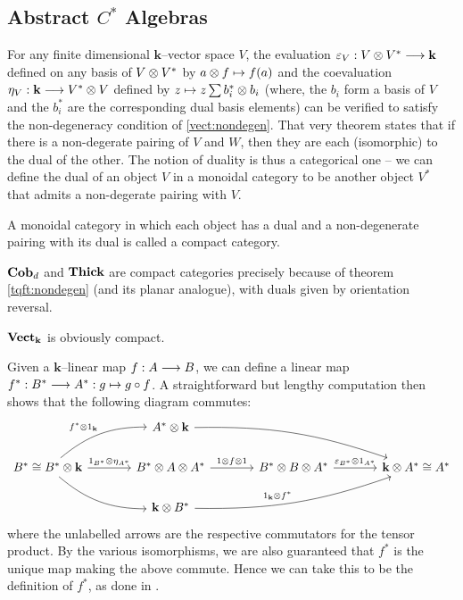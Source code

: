
\subsection{Abstract \texorpdfstring{$C^*$}{C--star} Algebras}

For any finite dimensional $\mathbf{k}$--vector space $V$, the evaluation
$\varepsilon_V : V \otimes V^* \stackrel{}{\longrightarrow} \mathbf{k}$ defined on any basis of
$V \otimes V^*$ by $a \otimes f \mapsto f(a)$ and the coevaluation
$\eta_V : \mathbf{k} \stackrel{}{\longrightarrow} V^* \otimes V$ defined by
$z \mapsto z\sum b_i^* \otimes b_i$ (where, the $b_i$ form a basis of $V$ and
the $b_i^*$ are the corresponding dual basis elements) can be verified to
satisfy the non-degeneracy condition of \ref{vect:nondegen}. That very theorem
states that if there is a non-degerate pairing of $V$ and $W$, then they are
each (isomorphic) to the dual of the other. The notion of duality is thus a
categorical one -- we can define the dual of an object $V$ in a monoidal
category to be another object $V^*$ that admits a non-degerate pairing with $V$.

\begin{defn}
A monoidal category in which each object has a dual and a non-degenerate pairing
with its dual is called a compact category.
\end{defn}

\begin{exm}
$\textbf{Cob}_d$ and $\textbf{Thick}$ are compact categories precisely because of theorem
\ref{tqft:nondegen} (and its planar analogue), with duals given by orientation
reversal.
\end{exm}

\begin{exm}
$\textbf{Vect}_{\mathbf{k}}$ is obviously compact.
\end{exm}

Given a $\mathbf{k}$--linear map $f : A \stackrel{}{\longrightarrow} B$, we can define a linear map
$f^* : B^* \stackrel{}{\longrightarrow} A^* : g \mapsto g \circ f$. A straightforward but lengthy computation
then shows that the following diagram commutes:
\begin{eqnarray*}
\begin{tikzcd}[column sep=large]
& A^* \m \mathbf{k} \arrow[drr, bend left=10] & & \\
B^* \cong B^* \m \mathbf{k}
  \arrow[r, "1_{B^*} \m \eta_{A^*}"]
  \arrow[ur, bend left=20, "f^* \m 1_{\mathbf{k}}"]
  \arrow[dr, bend right=20] &
B^* \m A \m A^* \arrow[r, "1 \m f \m 1"] &
B^* \m B \m A^* \arrow[r, "\eps_{B^*} \m 1_{A^*}"] &
\mathbf{k} \m A^* \cong A^* \\
& \mathbf{k} \m B^*
  \arrow[urr, bend right=10, "1_{\mathbf{k}} \m f^*"] & &
\end{tikzcd}
\end{eqnarray*}
where the unlabelled arrows are the respective commutators for the tensor
product. By the various isomorphisms, we are also guaranteed that $f^*$ is the
unique map making the above commute. Hence we can take this to be the definition
of $f^*$, as done in \cite[6]{channels}.

